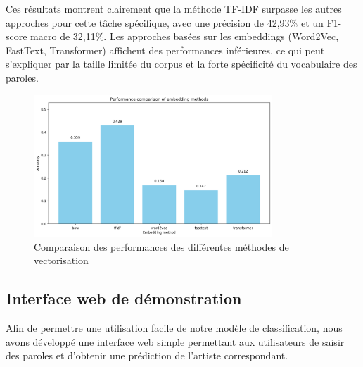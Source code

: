 \documentclass[a4paper,11pt]{article}
\begin{document}
Ces résultats montrent clairement que la méthode TF-IDF surpasse les autres approches pour cette tâche spécifique, avec une précision de 42,93\% et un F1-score macro de 32,11\%. Les approches basées sur les embeddings (Word2Vec, FastText, Transformer) affichent des performances inférieures, ce qui peut s'expliquer par la taille limitée du corpus et la forte spécificité du vocabulaire des paroles.

\begin{figure}[ht]
    \centering
    \includegraphics[width=0.8\textwidth]{results_rapport/embedding_accuracy_comparison.png}
    \caption{Comparaison des performances des différentes méthodes de vectorisation}
    \label{fig:embedding-comparison}
\end{figure}

\subsection{Interface web de démonstration}
Afin de permettre une utilisation facile de notre modèle de classification, nous avons développé une interface web simple permettant aux utilisateurs de saisir des paroles et d'obtenir une prédiction de l'artiste correspondant.
\end{document}
